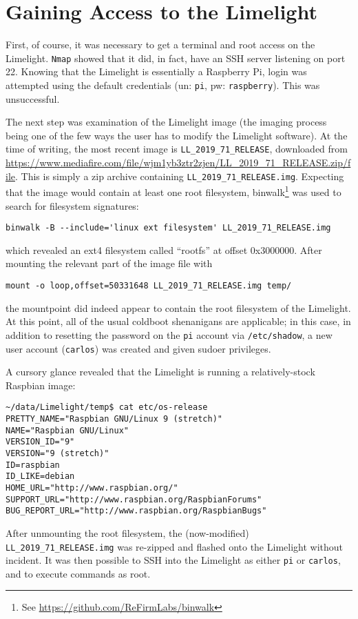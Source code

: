 \documentclass{article}
\begin{document}
\section{Gaining Access to the Limelight}
\par First, of course, it was necessary to get a terminal and root access on the Limelight. \texttt{Nmap} showed that it did, in fact, have an SSH server listening on port 22. Knowing that the Limelight is essentially a Raspberry Pi, login was attempted using the default credentials (un: \texttt{pi}, pw: \texttt{raspberry}). This was unsuccessful.
\par The next step was examination of the Limelight image (the imaging process being one of the few ways the user has to modify the Limelight software). At the time of writing, the most recent image is \texttt{LL\_2019\_71\_RELEASE}, downloaded from \url{https://www.mediafire.com/file/wjm1yb3ztr2zjen/LL\_2019\_71\_RELEASE.zip/file}. This is simply a zip archive containing \texttt{LL\_2019\_71\_RELEASE.img}. Expecting that the image would contain at least one root filesystem, binwalk\footnote{See \url{https://github.com/ReFirmLabs/binwalk}} was used to search for filesystem signatures: 
\begin{verbatim}
binwalk -B --include='linux ext filesystem' LL_2019_71_RELEASE.img
\end{verbatim}
which revealed an ext4 filesystem called ``rootfs'' at offset 0x3000000. After mounting the relevant part of the image file with 
\begin{verbatim}
mount -o loop,offset=50331648 LL_2019_71_RELEASE.img temp/
\end{verbatim}
the mountpoint did indeed appear to contain the root filesystem of the Limelight. At this point, all of the usual coldboot shenanigans are applicable; in this case, in addition to resetting the password on the \texttt{pi} account via \texttt{/etc/shadow}, a new user account (\texttt{carlos}) was created and given sudoer privileges. 
\par A cursory glance revealed that the Limelight is running a relatively-stock Raspbian image:
\begin{verbatim}
~/data/Limelight/temp$ cat etc/os-release
PRETTY_NAME="Raspbian GNU/Linux 9 (stretch)"
NAME="Raspbian GNU/Linux"
VERSION_ID="9"
VERSION="9 (stretch)"
ID=raspbian
ID_LIKE=debian
HOME_URL="http://www.raspbian.org/"
SUPPORT_URL="http://www.raspbian.org/RaspbianForums"
BUG_REPORT_URL="http://www.raspbian.org/RaspbianBugs"
\end{verbatim}
\par After unmounting the root filesystem, the (now-modified) \texttt{LL\_2019\_71\_RELEASE.img} was re-zipped and flashed onto the Limelight without incident. It was then possible to SSH into the Limelight as either \texttt{pi} or \texttt{carlos}, and to execute commands as root. 
\end{document}
